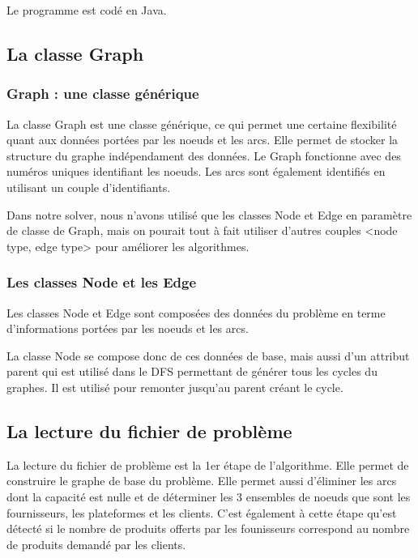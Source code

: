 \documentclass[a4paper,12pt]{article}
\begin{document}
Le programme est cod\'e en Java.

\subsection{La classe Graph}

\subsubsection{Graph : une classe g\'en\'erique}

La classe Graph est une classe g\'en\'erique, ce qui permet une certaine flexibilité quant aux données portées par les noeuds et les arcs. Elle permet de stocker la structure du graphe indépendament des données. Le Graph fonctionne avec des numéros uniques identifiant les noeuds. Les arcs sont également identifiés en utilisant un couple d'identifiants.

Dans notre solver, nous n'avons utilisé que les classes Node et Edge en paramètre de classe de Graph, mais on pourait tout à fait utiliser d'autres couples <node type, edge type> pour améliorer les algorithmes.

\subsubsection{Les classes Node et les Edge}

Les classes Node et Edge sont composées des données du problème en terme d'informations portées par les noeuds et les arcs.

La classe Node se compose donc de ces données de base, mais aussi d'un attribut parent qui est utilis\'e dans le DFS permettant de g\'en\'erer tous les cycles du graphes. Il est utilis\'e pour remonter jusqu'au parent cr\'eant le cycle.

\subsection{La lecture du fichier de problème}

La lecture du fichier de problème est la 1er étape de l'algorithme. Elle permet de construire le graphe de base du problème. Elle permet aussi d'éliminer les arcs dont la capacité est nulle et de déterminer les 3 ensembles de noeuds que sont les fournisseurs, les plateformes et les clients. C'est également à cette étape qu'est détecté si le nombre de produits offerts par les founisseurs correspond au nombre de produits demandé par les clients.
\end{document}
